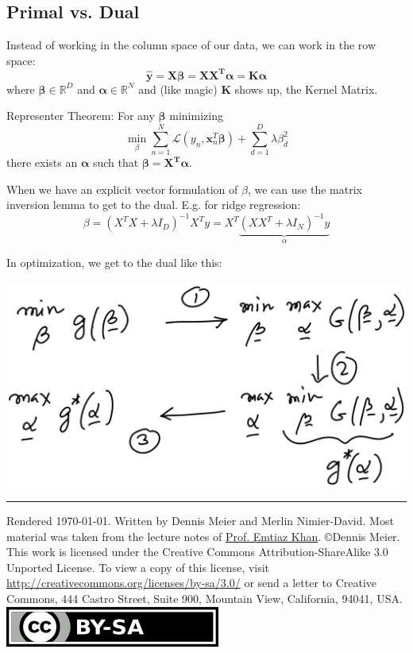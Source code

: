 \documentclass[10pt,a4paper,landscape]{article}
\providecommand{\bf}[1]{\ensuremath{\mathbf{#1}}}
\begin{document}
\begin{multicols*}{4}
\subsection{Primal vs. Dual}
Instead of working in the column space of our data, we can work in the row space:
$$\bf{\hat{y} = X \beta = X X^T \alpha = K \alpha}$$
where $\bf{\beta} \in \mathbb{R}^D$ and $\bf{\alpha} \in \mathbb{R}^N$
and (like magic) $\bf{K}$ shows up, the Kernel Matrix.

Representer Theorem: For any $\bf{\beta}$ minimizing
$$\min_\beta \sum_{n=1}^N \mathcal{L}(y_n, \bf{x}_n^T \bf{\beta}) + \sum_{d=1}^D \lambda \beta_d^2$$
there exists an $\bf{\alpha}$ such that $\bf{\beta = X^T \alpha}$.

When we have an explicit vector formulation of $\beta$, we can use the matrix inversion lemma to get to the dual. E.g. for ridge regression:
$$\beta = (X^T X  + \lambda I_D)^{-1} X^T y = X^T \underbrace{(X X^T + \lambda I_N)^{-1} y}_{\alpha}$$

In optimization, we get to the dual like this:
\begin{colfig}
  \centering
  \includegraphics[width=\linewidth]{images/prim-dual.png}
\end{colfig}




\hrule
\tiny
Rendered \today. Written by Dennis Meier and Merlin Nimier-David. Most material was taken from the lecture notes of \href{http://people.epfl.ch/228491}{Prof. Emtiaz Khan}.
\copyright Dennis Meier. This work is licensed under the Creative Commons Attribution-ShareAlike 3.0 Unported License.
To view a copy of this license, visit \href{http://creativecommons.org/licenses/by-sa/3.0/}{http://creativecommons.org/licenses/by-sa/3.0/} or
send a letter to Creative Commons, 444 Castro Street, Suite 900, Mountain View, California, 94041, USA.
\includegraphics{images/by-sa.png}

\end{multicols*}
\end{document}
